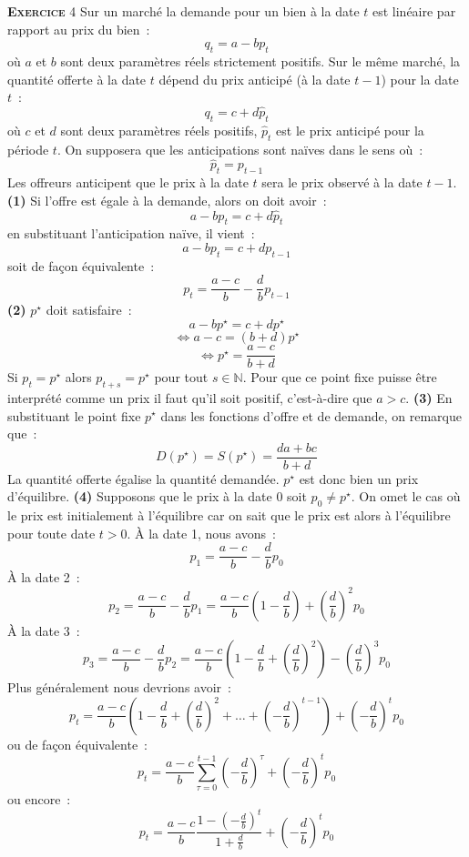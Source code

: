 \documentclass[10pt,a4paper,notitlepage]{article}
\newcommand{\exercice}[1]{\textsc{\textbf{Exercice}} #1}
\begin{document}
\exercice{4} Sur un marché la demande pour un bien à la date $t$ est linéaire par
rapport au prix du bien :
\[
q_t = a - b p_t
\]
où $a$ et $b$ sont deux paramètres réels strictement positifs. Sur le même marché,
la quantité offerte à la date $t$ dépend du prix anticipé (à la date
$t-1$) pour la date $t$ :
\[
q_t = c + d \hat p_t
\]
où $c$ et $d$ sont deux paramètres réels positifs, $\hat p_t$ est le
prix anticipé pour la période $t$. On supposera que les anticipations
sont naïves dans le sens où :
\[
\hat p_t = p_{t-1}
\]
Les offreurs anticipent que le prix à la date $t$ sera le prix observé
à la date $t-1$. \textbf{(1)} Si l'offre est égale à la demande, alors
on doit avoir :
\[
a - b p_t = c + d \hat p_t
\]
en substituant l'anticipation naïve, il vient :
\[
a - b p_t = c + d p_{t-1}
\]
soit de façon équivalente :
\[
p_t = \frac{a-c}{b} - \frac{d}{b}p_{t-1}
\]
\textbf{(2)} $p^{\star}$ doit satisfaire :
\[
a - b p^{\star} = c + d p^{\star}
\]
\[
\Leftrightarrow a - c = (b+d) p^{\star}
\]
\[
\Leftrightarrow  p^{\star} = \frac{a-c}{b+d}
\]
Si $p_t = p^{\star}$ alors $p_{t+s} = p^{\star}$ pour tout $s\in
\mathbb N$. Pour que ce point fixe puisse être interprété comme un
prix il faut qu'il soit positif, c'est-à-dire que $a>c$. \textbf{(3)}
En substituant le point fixe $p^{\star}$ dans les fonctions d'offre et
de demande, on remarque que :
\[
D(p^{\star}) = S(p^{\star}) = \frac{da+bc}{b+d}
\]
La quantité offerte égalise la quantité demandée. $p^{\star}$ est
donc bien un prix d'équilibre. \textbf{(4)}
Supposons que  le prix à la date 0 soit $p_0\neq p^{\star}$. On omet
le cas où le prix est initialement à l'équilibre car on sait que le
prix est alors à l'équilibre pour toute date $t>0$. À la date 1, nous
avons :
\[
p_1 = \frac{a-c}{b} - \frac{d}{b}p_0
\]
À la date 2 :
\[
p_2 = \frac{a-c}{b} - \frac{d}{b}p_1 =
\frac{a-c}{b}\left(1-\frac{d}{b}\right) + \left(\frac{d}{b}\right)^2p_0
\]
À la date 3 :
\[
p_3 = \frac{a-c}{b} - \frac{d}{b}p_2 =
\frac{a-c}{b}\left(1-\frac{d}{b}+\left(\frac{d}{b}\right)^2\right) - \left(\frac{d}{b}\right)^3p_0
\]
Plus généralement nous devrions avoir :
\[
p_t =
\frac{a-c}{b}\left(1-\frac{d}{b}+\left(\frac{d}{b}\right)^2+\dots+\left(-\frac{d}{b}\right)^{t-1}\right)
+ \left(-\frac{d}{b}\right)^{t}p_0
\]
ou de façon équivalente :
\[
p_t = \frac{a-c}{b}\sum_{\tau=0}^{t-1}
\left(-\frac{d}{b}\right)^{\tau} + \left(-\frac{d}{b}\right)^{t}p_0
\]
ou encore :
\[
p_t = \frac{a-c}{b}\frac{1-\left(-\frac{d}{b}\right)^{t}}{1+\frac{d}{b}} + \left(-\frac{d}{b}\right)^{t}p_0
\]
\end{document}
